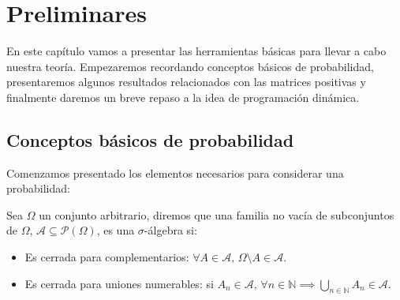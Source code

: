 \chapter{Preliminares}

En este capítulo vamos a presentar las herramientas básicas para llevar a cabo nuestra teoría. Empezaremos recordando conceptos básicos de probabilidad, presentaremos algunos resultados relacionados con las matrices positivas y finalmente daremos un breve repaso a la idea de programación dinámica.

\section{Conceptos básicos de probabilidad}
Comenzamos presentado los elementos necesarios para considerar una probabilidad:
\begin{definition}
    Sea $\Omega$ un conjunto arbitrario, diremos que una familia no vacía de subconjuntos de $\Omega$, $\mathcal{A}\subseteq\mathcal{P}(\Omega)$, es una $\sigma$-álgebra si:
    \begin{itemize}
        \item Es cerrada para complementarios: $\forall A\in\mathcal{A},\, \Omega\setminus A\in\mathcal{A}.$
        \item Es cerrada para uniones numerables: si $A_{n}\in\mathcal{A}, \,\forall n\in\mathbb{N}  \implies \displaystyle\bigcup_{n\in\mathbb{N}}A_n\in\mathcal{A}.$
    \end{itemize}
\end{definition}


